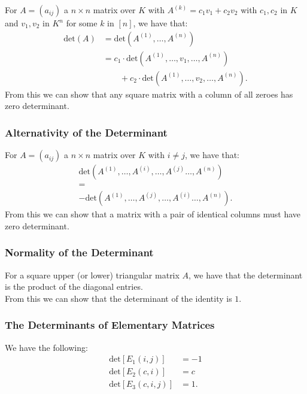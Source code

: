 For $A = (a_{ij})$ a $n \times n$ matrix over $K$ with
$A^{(k)} = c_1v_1 + c_2v_2$ with $c_1, c_2$ in $K$ and
$v_1, v_2$ in $K^n$ for some $k$ in $[n]$, we have that: \begin{align*}
  \text{det}(A) &= \text{det}(A^{(1)}, \ldots, A^{(n)}) \\
  &= c_1 \cdot \text{det}(A^{(1)}, \ldots, v_1, \ldots, A^{(n)}) \\
  & \qquad + c_2 \cdot \text{det}(A^{(1)}, \ldots, v_2, \ldots, A^{(n)}).
\end{align*} From this we can show that any square matrix with a column
of all zeroes has zero determinant.

\subsubsection{Alternativity of the Determinant}

For $A = (a_{ij})$ a $n \times n$ matrix over $K$ with
$i \neq j$, we have that: \begin{gather*}
  \text{det}(A^{(1)}, \ldots, A^{(i)}, \ldots, A^{(j)} \ldots, A^{(n)}) \\
  =\\
  -\text{det}(A^{(1)}, \ldots, A^{(j)}, \ldots, A^{(i)} \ldots, A^{(n)}).
\end{gather*} From this we can show that a matrix with a pair of
identical columns must have zero determinant.

\subsubsection{Normality of the Determinant}

For a square upper (or lower) triangular matrix $A$, we have that
the determinant is the product of the diagonal entries.
\\[\baselineskip]
From this we can show that the determinant of the identity is $1$.

\subsubsection{The Determinants of Elementary Matrices}

We have the following: \begin{align*}
  \text{det}\left[E_1(i, j)\right] &= -1 \\
  \text{det}\left[E_2(c, i)\right] &= c \\
  \text{det}\left[E_3(c, i, j)\right] &= 1.
\end{align*}

